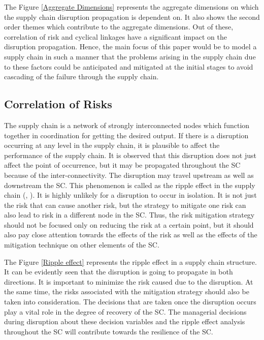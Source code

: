 The Figure \ref{Aggregate Dimensions} represents the aggregate dimensions on which the supply chain disruption propagation is dependent on. It also shows the second order themes which contribute to the aggregate dimensions. Out of these, correlation of risk and cyclical linkages have a significant impact on the disruption propagation. Hence, the main focus of this paper would be to model a supply chain in such a manner that the problems arising in the supply chain due to these factors could be anticipated and mitigated at the initial stages to avoid cascading of the failure through the supply chain.

\subsection{Correlation of Risks}
The supply chain is a network of strongly interconnected nodes which function together in coordination for getting the desired output. If there is a disruption occurring at any level in the supply chain, it is plausible to affect the performance of the supply chain. It is observed that this disruption does not just affect the point of occurrence, but it may be propagated throughout the SC because of the inter-connectivity. The disruption may travel upstream as well as downstream the SC. This phenomenon is called as the ripple effect in the supply chain (\citeauthor{ivanov2017simulation}, \citeyear{ivanov2017simulation}). It is highly unlikely for a disruption to occur in isolation. It is not just the risk that can cause another risk, but the strategy to mitigate one risk can also lead to risk in a different node in the SC. Thus, the risk mitigation strategy should not be focused only on reducing the risk at a certain point, but it should also pay close attention towards the effects of the risk as well as the effects of the mitigation technique on other elements of the SC.

The Figure \ref{Ripple effect} represents the ripple effect in a supply chain structure. It can be evidently seen that the disruption is going to propagate in both directions. It is important to minimize the risk caused due to the disruption. At the same time, the risks associated with the mitigation strategy should also be taken into consideration. The decisions that are taken once the disruption occurs play a vital role in the degree of recovery of the SC. The managerial decisions during disruption about these decision variables and the ripple effect analysis throughout the SC will contribute towards the resilience of the SC.

